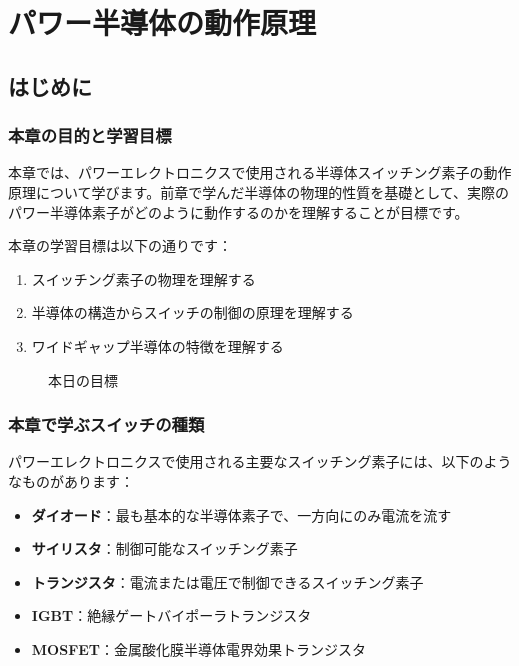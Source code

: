 
\chapter{パワー半導体の動作原理}

\section{はじめに}

\subsection{本章の目的と学習目標}

本章では、パワーエレクトロニクスで使用される半導体スイッチング素子の動作原理について学びます。前章で学んだ半導体の物理的性質を基礎として、実際のパワー半導体素子がどのように動作するのかを理解することが目標です。

本章の学習目標は以下の通りです：

\begin{enumerate}
\item スイッチング素子の物理を理解する
\item 半導体の構造からスイッチの制御の原理を理解する
\item ワイドギャップ半導体の特徴を理解する
\end{enumerate}

\begin{figure}[H]
\centering
{}
\caption{本日の目標}
\label{fig:objectives}
\end{figure}

\subsection{本章で学ぶスイッチの種類}

パワーエレクトロニクスで使用される主要なスイッチング素子には、以下のようなものがあります：

\begin{itemize}
\item \textbf{ダイオード}：最も基本的な半導体素子で、一方向にのみ電流を流す
\item \textbf{サイリスタ}：制御可能なスイッチング素子
\item \textbf{トランジスタ}：電流または電圧で制御できるスイッチング素子
\item \textbf{IGBT}：絶縁ゲートバイポーラトランジスタ
\item \textbf{MOSFET}：金属酸化膜半導体電界効果トランジスタ
\end{itemize}

